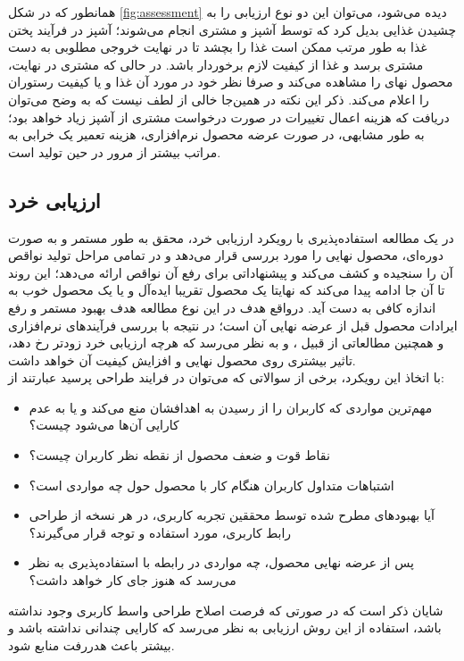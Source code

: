 همانطور که در شکل
\ref{fig:assessment}
دیده می‌شود، می‌توان این دو نوع ارزیابی را به  چشیدن غذایی بدیل کرد که توسط آشپز و مشتری انجام می‌شوند؛ آشپز در فرآیند پختن غذا به طور مرتب ممکن است غذا را بچشد تا در نهایت خروجی مطلوبی به دست مشتری برسد و غذا از کیفیت لازم برخوردار باشد. در حالی که مشتری در نهایت، محصول نهای را مشاهده می‌کند و صرفا نظر خود در مورد آن غذا و یا کیفیت رستوران را اعلام می‌کند. ذکر این نکته  در همین‌جا خالی از لطف نیست که به وضح می‌توان دریافت که هزینه اعمال تغییرات در صورت درخواست مشتری از آشپز زیاد خواهد بود؛ به طور مشابهی، در صورت عرضه محصول نرم‌افزاری، هزینه تعمیر یک خرابی به مراتب بیشتر از مرور در حین تولید است.
\subsection{ارزیابی خرد}
در یک مطالعه استفاده‌پذیری با رویکرد ارزیابی خرد، محقق به طور مستمر و به صورت دوره‌ای، محصول نهایی را مورد بررسی قرار می‌دهد و در تمامی مراحل تولید نواقص آن را سنجیده و کشف می‌کند و پیشنهاداتی برای رفع آن نواقص ارائه می‌دهد؛ این روند  تا آن جا ادامه پیدا می‌کند که نهایتا یک محصول تقریبا ایده‌آل و یا یک محصول خوب به اندازه کافی
به دست آید. درواقع هدف در این نوع مطالعه هدف بهبود مستمر و رفع ایرادات محصول قبل از عرضه نهایی آن است؛ در نتیجه با بررسی فرآیندهای نرم‌افزاری و همچنین مطالعاتی از قبیل
\cite{sommerville_software_2016}،
\cite{krug_dont_2000} و
\cite{albert_measuring_2013}
به نظر می‌رسد که هرچه ارزیابی خرد زودتر رخ دهد، تاثیر بیشتری روی محصول نهایی و افزایش کیفیت آن خواهد داشت.\\
با اتخاذ این رویکرد، برخی از سوالاتی که می‌توان در فرایند طراحی پرسید عبارتند از:
\begin{itemize}
	\item 
	مهم‌ترین مواردی که کاربران را از رسیدن به اهدافشان منع می‌کند و یا به عدم کارایی آن‌ها می‌شود چیست؟
	\item 
	نقاط قوت و ضعف محصول از نقطه نظر کاربران چیست؟
	\item 
	اشتباهات متداول کاربران هنگام کار با محصول حول چه مواردی است؟
	\item 
	آیا بهبودهای مطرح شده توسط محققین تجربه کاربری، در هر نسخه از طراحی رابط کاربری، مورد استفاده و توجه قرار می‌گیرند؟
	\item 
	پس از عرضه نهایی محصول، چه مواردی در رابطه با استفاده‌پذیری به نظر می‌رسد که هنوز جای کار خواهد داشت؟
	
\end{itemize}
شایان ذکر است که در صورتی که فرصت اصلاح طراحی واسط کاربری وجود نداشته باشد، استفاده از این روش ارزیابی به نظر می‌رسد که کارایی چندانی نداشته باشد و بیشتر باعث هدررفت منابع شود.
